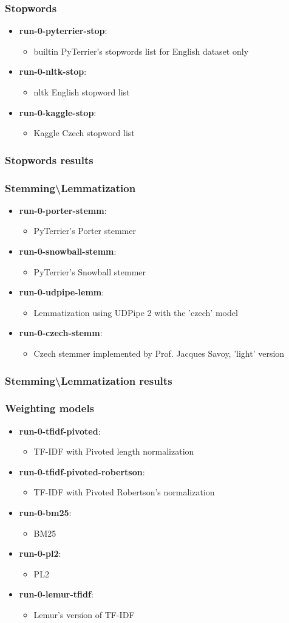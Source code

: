 \documentclass{beamer}
\newcommand{\RunName}[1]{\textbf{#1}}
\let\Oldinput
\renewcommand{}[1]{\resizebox{\textwidth}{!}{\Oldinput{#1}}}
\newcommand{\RunShort}[2]{
  \RunName{#1}:
  \begin{itemize}
    \item #2
  \end{itemize}
}
\newcommand{\RunResults}[2]{%
\begin{table}[h]
\centering

    \caption{Results of #2.\label{tbl:#1}}
\end{table}
}
\begin{document}
\begin{frame}
  \frametitle{Stopwords}
  \begin{itemize}
    \item \RunShort{run-0-pyterrier-stop}{builtin PyTerrier's stopwords list for English dataset only}

    \item \RunShort{run-0-nltk-stop}{nltk English stopword list}
    \item \RunShort{run-0-kaggle-stop}{ Kaggle Czech stopword list }
  \end{itemize}
\end{frame}

\begin{frame}
  \frametitle{Stopwords results}
\RunResults{stopwords}{\RunName{run-0-pyterrier-stop}, \RunName{run-0-nltk-stop}
and \RunName{run-0-kaggle-stop}}
\end{frame}

\begin{frame}
  \frametitle{Stemming{\textbackslash}Lemmatization}
  \begin{itemize}
    \item \RunShort{run-0-porter-stemm}{PyTerrier's Porter stemmer}
    \item \RunShort{run-0-snowball-stemm}{PyTerrier's Snowball stemmer}
    \item \RunShort{run-0-udpipe-lemm}{Lemmatization using UDPipe 2 with the 'czech' model}
    \item \RunShort{run-0-czech-stemm}{Czech stemmer implemented by Prof. Jacques Savoy, 'light' version}
  \end{itemize}
\end{frame}

\begin{frame}
  \frametitle{Stemming{\textbackslash}Lemmatization results}
\RunResults{stemmers}{\RunName{run-0-porter-stemm},
\RunName{run-0-snowball-stem}, \RunName{run-0-udpipe-lemm} and
\RunName{run-0-czech-stemm}}
\end{frame}

\begin{frame}
  \frametitle{Weighting models}
  \begin{itemize}
    \item \RunShort{run-0-tfidf-pivoted}{TF-IDF with Pivoted length normalization}
    \item \RunShort{run-0-tfidf-pivoted-robertson}{TF-IDF with Pivoted Robertson's normalization}
    \item \RunShort{run-0-bm25}{BM25}
    \item \RunShort{run-0-pl2}{PL2}
    \item \RunShort{run-0-lemur-tfidf}{Lemur's version of TF-IDF}


  \end{itemize}
\end{frame}
\end{document}

